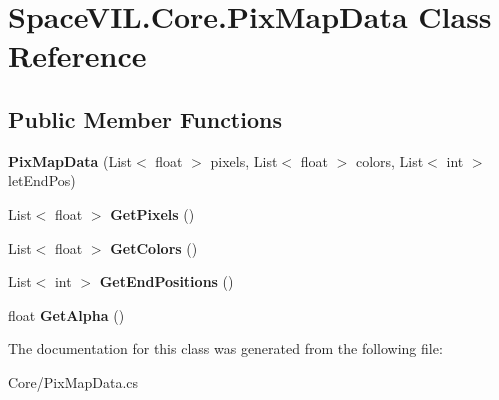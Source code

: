 \hypertarget{class_space_v_i_l_1_1_core_1_1_pix_map_data}{}\section{Space\+V\+I\+L.\+Core.\+Pix\+Map\+Data Class Reference}
\label{class_space_v_i_l_1_1_core_1_1_pix_map_data}
\subsection*{Public Member Functions}
\begin{DoxyCompactItemize}
\item 
\mbox{\label{class_space_v_i_l_1_1_core_1_1_pix_map_data_ae32bd8af8db1852dc00091d0bfe9f720}} 
{\bfseries Pix\+Map\+Data} (List$<$ float $>$ pixels, List$<$ float $>$ colors, List$<$ int $>$ let\+End\+Pos)
\item 
\mbox{\label{class_space_v_i_l_1_1_core_1_1_pix_map_data_a8526f59fae2860c355faecbc0f54f2b0}} 
List$<$ float $>$ {\bfseries Get\+Pixels} ()
\item 
\mbox{\label{class_space_v_i_l_1_1_core_1_1_pix_map_data_ac0015c2088269f8b78c972562655c364}} 
List$<$ float $>$ {\bfseries Get\+Colors} ()
\item 
\mbox{\label{class_space_v_i_l_1_1_core_1_1_pix_map_data_a99f5c764784d7706a251317bc92ea51e}} 
List$<$ int $>$ {\bfseries Get\+End\+Positions} ()
\item 
\mbox{\label{class_space_v_i_l_1_1_core_1_1_pix_map_data_a7d517574eaa80338ff9ff44e5fe15027}} 
float {\bfseries Get\+Alpha} ()
\end{DoxyCompactItemize}


The documentation for this class was generated from the following file\+:\begin{DoxyCompactItemize}
\item 
Core/Pix\+Map\+Data.\+cs\end{DoxyCompactItemize}
